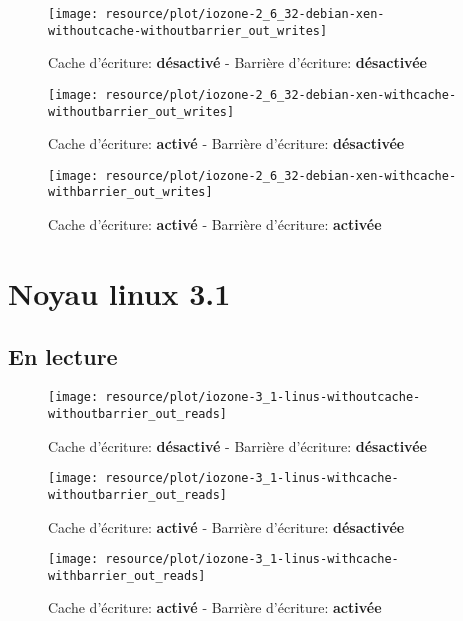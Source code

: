 \begin{figure}[H]
	\centering
	\texttt{[image: resource/plot/iozone-2\_6\_32-debian-xen-withoutcache-withoutbarrier\_out\_writes]}
	\caption{Cache d'écriture: \textbf{désactivé}   -   Barrière d'écriture: \textbf{désactivée}}
\end{figure}

\begin{figure}[H]
	\centering
	\texttt{[image: resource/plot/iozone-2\_6\_32-debian-xen-withcache-withoutbarrier\_out\_writes]}
	\caption{Cache d'écriture: \textbf{activé}   -   Barrière d'écriture: \textbf{désactivée}}
\end{figure}

\begin{figure}[H]
	\centering
	\texttt{[image: resource/plot/iozone-2\_6\_32-debian-xen-withcache-withbarrier\_out\_writes]}
	\caption{Cache d'écriture: \textbf{activé}   -   Barrière d'écriture: \textbf{activée}}
\end{figure}

\section{Noyau linux 3.1}

\subsection*{En lecture}

\begin{figure}[H]
	\centering
	\texttt{[image: resource/plot/iozone-3\_1-linus-withoutcache-withoutbarrier\_out\_reads]}
	\caption{Cache d'écriture: \textbf{désactivé}   -   Barrière d'écriture: \textbf{désactivée}}
\end{figure}

\begin{figure}[H]
	\centering
	\texttt{[image: resource/plot/iozone-3\_1-linus-withcache-withoutbarrier\_out\_reads]}
	\caption{Cache d'écriture: \textbf{activé}   -   Barrière d'écriture: \textbf{désactivée}}
\end{figure}

\begin{figure}[H]
	\centering
	\texttt{[image: resource/plot/iozone-3\_1-linus-withcache-withbarrier\_out\_reads]}
	\caption{Cache d'écriture: \textbf{activé}   -   Barrière d'écriture: \textbf{activée}}
\end{figure}

